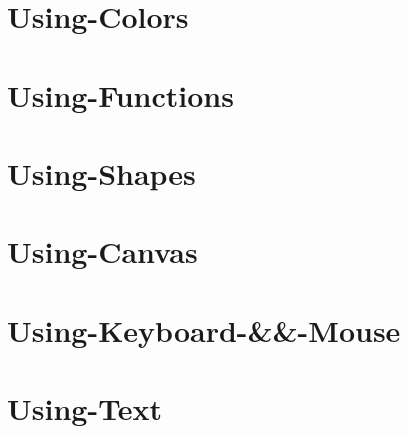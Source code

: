 \documentclass[twoside]{book}
\newcommand{\+}{\discretionary{\mbox{\scriptsize$\hookleftarrow$}}{}{}}
\begin{document}
\chapter{Using-\/\+Colors}
\label{md__home_pretzel_workspace_tsgl__t_s_g_l_docs-wiki_tutorials__using-_colors}
\hypertarget{md__home_pretzel_workspace_tsgl__t_s_g_l_docs-wiki_tutorials__using-_colors}{}

\chapter{Using-\/\+Functions}
\label{md__home_pretzel_workspace_tsgl__t_s_g_l_docs-wiki_tutorials__using-_functions}
\hypertarget{md__home_pretzel_workspace_tsgl__t_s_g_l_docs-wiki_tutorials__using-_functions}{}

\chapter{Using-\/\+Shapes}
\label{md__home_pretzel_workspace_tsgl__t_s_g_l_docs-wiki_tutorials__using-_shapes}
\hypertarget{md__home_pretzel_workspace_tsgl__t_s_g_l_docs-wiki_tutorials__using-_shapes}{}

\chapter{Using-\/\+Canvas}
\label{md__home_pretzel_workspace_tsgl__t_s_g_l_docs-wiki__using-_canvas}
\hypertarget{md__home_pretzel_workspace_tsgl__t_s_g_l_docs-wiki__using-_canvas}{}

\chapter{Using-\/\+Keyboard-\/\&\&-\/\+Mouse}
\label{md__home_pretzel_workspace_tsgl__t_s_g_l_docs-wiki__using-_keyboard-_6_6-_mouse}
\hypertarget{md__home_pretzel_workspace_tsgl__t_s_g_l_docs-wiki__using-_keyboard-_6_6-_mouse}{}

\chapter{Using-\/\+Text}
\label{md__home_pretzel_workspace_tsgl__t_s_g_l_docs-wiki__using-_text}
\hypertarget{md__home_pretzel_workspace_tsgl__t_s_g_l_docs-wiki__using-_text}{}

\end{document}
